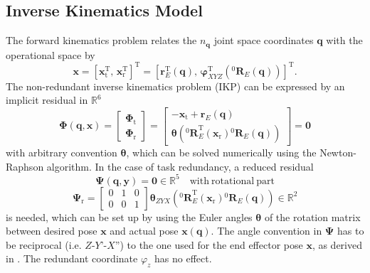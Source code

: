 \documentclass[a4paper,twoside]{article}
\newcommand{\transp}[0]{{\mathrm{T}}}
\newcommand{\rotmat}[2]{{{ }^{#1}\boldsymbol{R}}_{#2}}
\begin{document}
\subsection{Inverse Kinematics Model}
\label{sec:ikp_serrob}


The forward kinematics problem relates the $n_{\bm{q}}$ joint space coordinates $\bm{q}$ with the operational space by
\begin{equation}
\bm{x}=\left[\bm{x}_{\mathrm{t}}^\transp,\,\bm{x}_{\mathrm{r}}^\transp\right]^\transp
=
\left[\bm{r}_E^\transp(\bm{q}),\,\bm{\varphi}_{XYZ}^\transp(\rotmat{0}{E}(\bm{q}))\right]^\transp.
\label{eq:ser_fkin}
\end{equation}
The non-redundant inverse kinematics problem (IKP) can be expressed by an implicit residual in $\mathbb{R}^6$
\begin{equation}
\bm{\Phi}(\bm{q},\bm{x})
=
\begin{bmatrix}
\bm{\Phi}_\mathrm{t} \\
\bm{\Phi}_\mathrm{r}
\end{bmatrix}
=
\begin{bmatrix}
-\bm{x}_{\mathrm{t}}+\bm{r}_E(\bm{q}) \\
\bm{\theta}\left(\rotmat{0}{E}^\transp (\bm{x}_{\mathrm{r}})\rotmat{0}{E}(\bm{q})\right)
\end{bmatrix}
=
\bm{0} %
\label{eq:ser_residual_full}
\end{equation}
with arbitrary convention $\bm{\theta}$, which can be solved numerically using the Newton-Raphson algorithm.
In the case of task redundancy, a reduced residual
\begin{equation}
\bm{\Psi}(\bm{q},\bm{y})=\bm{0} \in \mathbb{R}^5 \quad \mathrm{with~rotational~part} 
\label{eq:ser_residual_red}
\end{equation}
\begin{equation}
\bm{\Psi}_\mathrm{r}
=
{\begin{bmatrix}
	0 & 1 & 0  \\ 
	0 & 0 & 1
	\end{bmatrix}}
\bm{\theta}_{ZYX}\left(\rotmat{0}{E}^\transp (\bm{x}_{\mathrm{r}})\rotmat{0}{E}(\bm{q})\right)
 \in \mathbb{R}^2
\label{eq:ser_residual_red_rot}
\end{equation}
is needed, which can be set up by using the Euler angles $\bm{\theta}$ of the rotation matrix between desired pose $\bm{x}$ and actual pose $\bm{x}(\bm{q})$.
The angle convention in $\bm{\Psi}$ has to be reciprocal (i.e. $Z$-$Y$'-$X$'') to the one used for the end effector pose $\bm{x}$, as derived in \cite{SchapplerTapOrt2019}.
The redundant coordinate $\varphi_z$ has no effect.
\end{document}

